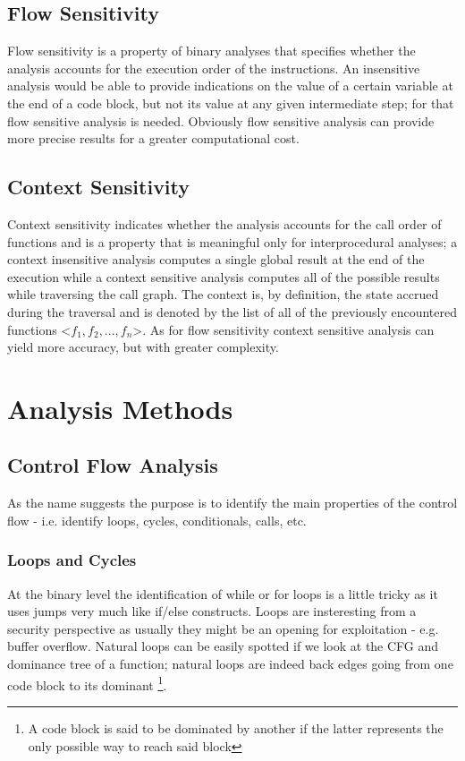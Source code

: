 \subsection{Flow Sensitivity}
Flow sensitivity is a property of binary analyses that specifies whether the analysis accounts for the execution order
of the instructions. An insensitive analysis would be able to provide indications on the value of a certain variable at
the end of a code block, but not its value at any given intermediate step; for that flow sensitive analysis is needed.
Obviously flow sensitive analysis can provide more precise results for a greater computational cost.


\subsection{Context Sensitivity}
Context sensitivity indicates whether the analysis accounts for the call order of functions and is a property that is
meaningful only for interprocedural analyses; a context insensitive analysis computes a single global result at the end
of the execution while a context sensitive analysis computes all of the possible results while traversing the call
graph. The context is, by definition, the state accrued during the traversal and is denoted by the list of all of the
previously encountered functions <$f_1, f_2, ..., f_n$>. As for flow sensitivity context sensitive analysis can yield
more accuracy, but with greater complexity.



\section{Analysis Methods}


\subsection{Control Flow Analysis}
As the name suggests the purpose is to identify the main properties of the control flow - i.e. identify loops, cycles,
conditionals, calls, etc.

\subsubsection{Loops and Cycles}
At the binary level the identification of {\ttfamily while} or {\ttfamily for} loops is a little tricky as it uses jumps
very much like {\ttfamily if/else} constructs. Loops are insteresting from a security perspective as usually they might
be an opening for exploitation - e.g. buffer overflow. Natural loops can be easily spotted if we look at the CFG and
dominance tree of a function; natural loops are indeed back edges going from one code block to its dominant \footnote{A
code block is said to be dominated by another if the latter represents the only possible way to reach said block}.

